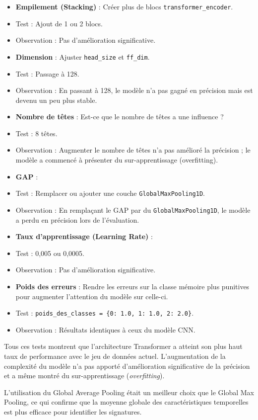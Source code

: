 \documentclass[12pt,a4paper]{report}
\begin{document}
\begin{itemize}
    \item \textbf{Empilement (Stacking)} : Créer plus de blocs \texttt{transformer\_encoder}.
    \item Test : Ajout de 1 ou 2 blocs.
    \item Observation : Pas d'amélioration significative.
    \item \textbf{Dimension} : Ajuster \texttt{head\_size} et \texttt{ff\_dim}.
    \item Test : Passage à 128.
    \item Observation : En passant à 128, le modèle n'a pas gagné en précision mais est devenu un peu plus stable.
    \item \textbf{Nombre de têtes} : Est-ce que le nombre de têtes a une influence ?
    \item Test : 8 têtes.
    \item Observation : Augmenter le nombre de têtes n'a pas amélioré la précision ; le modèle a commencé à présenter du sur-apprentissage (overfitting).
    \item \textbf{GAP} :
    \item Test : Remplacer ou ajouter une couche \texttt{GlobalMaxPooling1D}.
    \item Observation : En remplaçant le GAP par du \texttt{GlobalMaxPooling1D}, le modèle a perdu en précision lors de l'évaluation.
    \item \textbf{Taux d'apprentissage (Learning Rate)} :
    \item Test : 0,005 ou 0,0005.
    \item Observation : Pas d'amélioration significative.
    \item \textbf{Poids des erreurs} : Rendre les erreurs sur la classe mémoire plus punitives pour augmenter l'attention du modèle sur celle-ci.
    \item Test : \texttt{poids\_des\_classes = \{0: 1.0, 1: 1.0, 2: 2.0\}}.
    \item Observation : Résultats identiques à ceux du modèle CNN.
\end{itemize}

Tous ces tests montrent que l'architecture Transformer a atteint son plus haut taux de performance avec le jeu de données actuel. L'augmentation de la complexité du modèle n'a pas apporté d'amélioration significative de la précision et a même montré du sur-apprentissage (\textit{overfitting}). 

L'utilisation du Global Average Pooling était un meilleur choix que le Global Max Pooling, ce qui confirme que la moyenne globale des caractéristiques temporelles est plus efficace pour identifier les signatures.
\end{document}
